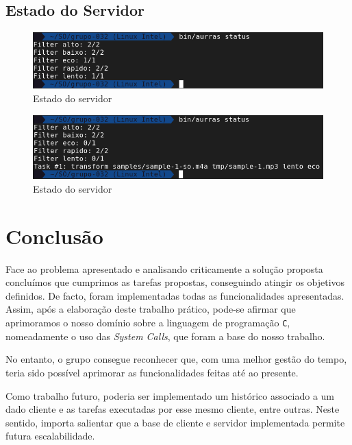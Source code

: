 \documentclass[a4paper, 11pt]{article}
\begin{document}
\subsection*{Estado do Servidor}

\begin{figure}[H]
    \centering
    \includegraphics[width=.8\textwidth]{img/status_1.png}
    \caption{Estado do servidor}
\end{figure}

\begin{figure}[H]
    \centering
    \includegraphics[width=.8\textwidth]{img/status_2.png}
    \caption{Estado do servidor}
\end{figure}

\pagebreak

\section{Conclusão}
\label{sec:conclusao}

Face ao problema apresentado e analisando criticamente a solução proposta concluímos que 
cumprimos as tarefas propostas, conseguindo atingir os objetivos definidos. De facto, foram 
implementadas todas as funcionalidades apresentadas. Assim, após a elaboração deste trabalho 
prático, pode-se afirmar que aprimoramos o nosso domínio sobre a linguagem de programação 
\texttt{C}, nomeadamente o uso das \textit{System Calls}, que foram a base do nosso trabalho.

No entanto, o grupo consegue reconhecer que, com uma melhor gestão do tempo, teria sido possível 
aprimorar as funcionalidades feitas até ao presente.

Como trabalho futuro, poderia ser implementado um histórico associado a um dado cliente e as 
tarefas executadas por esse mesmo cliente, entre outras. Neste sentido, importa salientar que a 
base de cliente e servidor implementada permite futura
escalabilidade.

\newpage


\printnomenclature
\end{document}
